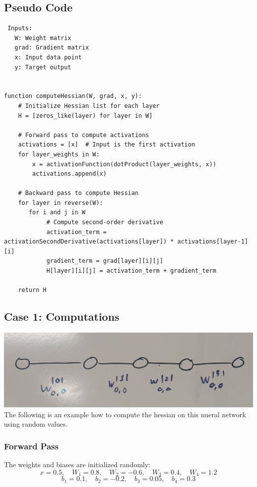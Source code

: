 \documentclass{article}
\begin{document}
\subsection{Pseudo Code}

\begin{verbatim}
 Inputs:
   W: Weight matrix 
   grad: Gradient matrix 
   x: Input data point
   y: Target output


function computeHessian(W, grad, x, y):
    # Initialize Hessian list for each layer
    H = [zeros_like(layer) for layer in W]

    # Forward pass to compute activations
    activations = [x]  # Input is the first activation
    for layer_weights in W:
        x = activationFunction(dotProduct(layer_weights, x))
        activations.append(x)

    # Backward pass to compute Hessian
    for layer in reverse(W):
       for i and j in W
            # Compute second-order derivative
            activation_term = activationSecondDerivative(activations[layer]) * activations[layer-1][i]
            gradient_term = grad[layer][i][j]
            H[layer][i][j] = activation_term + gradient_term

    return H

\end{verbatim}

\subsection{Case 1: Computations}
\includegraphics[scale=0.1]{../figs/Case 1.png} \\[0.5cm]

The following is an example how to compute the hessian on this nueral network using random values.

\subsubsection{Forward Pass}
The weights and biases are initialized randomly:
\[
x = 0.5, \quad W_1 = 0.8, \quad W_2 = -0.6, \quad W_3 = 0.4, \quad W_4 = 1.2
\]
\[
b_1 = 0.1, \quad b_2 = -0.2, \quad b_3 = 0.05, \quad b_4 = 0.3
\]
\end{document}
